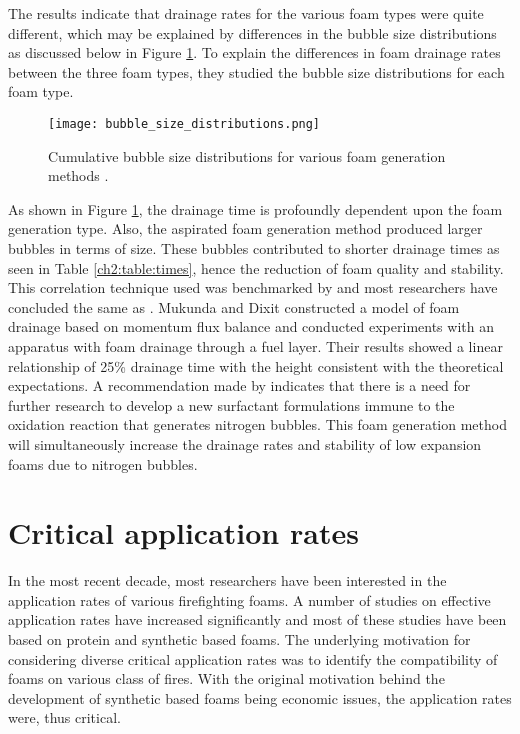 The results indicate that drainage rates for the various foam types were quite different, which may be explained by differences in the bubble size distributions as discussed below in Figure \ref{ch2:figure:distributions}. To explain the differences in foam drainage rates between the three foam types, they studied the bubble size distributions for each foam type.

\begin{figure}[H]
    \centering
    \texttt{[image: bubble\_size\_distributions.png]}
    \caption{Cumulative bubble size distributions for various foam generation methods \cite{laundess2012suppression}.}
    \label{ch2:figure:distributions}
\end{figure}

As shown in Figure \ref{ch2:figure:distributions}, the drainage time is profoundly dependent upon the foam generation type. Also, the aspirated foam generation method produced larger bubbles in terms of size. These bubbles contributed to shorter drainage times as seen in Table \ref{ch2:table:times}, hence the reduction of foam quality and stability. This correlation technique used was benchmarked by \cite{oguike2013study} and most researchers have concluded the same as \cite{laundess2012suppression}. Mukunda and Dixit \cite{csb2016phenomenological} constructed a model of foam drainage based on momentum flux balance and conducted experiments with an apparatus with foam drainage through a fuel layer. Their results showed a linear relationship of 25\% drainage time with the height consistent with the theoretical expectations. A recommendation made by \cite{laundess2012suppression} indicates that there is a need for further research to develop a new surfactant formulations immune to the oxidation reaction that generates nitrogen bubbles. This foam generation method will simultaneously increase the drainage rates and stability of low expansion foams due to nitrogen bubbles.

\section{Critical application rates}
In the most recent decade, most researchers have been interested in the application rates of various firefighting foams. A number of studies on effective application rates have increased significantly and most of these studies have been based on protein and synthetic based foams. The underlying motivation for considering diverse critical application rates was to identify the compatibility of foams on various class of fires. With the original motivation behind the development of synthetic based foams being economic issues, the application rates were, thus critical.

